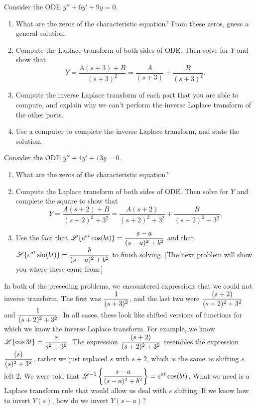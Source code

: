 \begin{problem}
 Consider the ODE $y''+6y'+9y=0$.  
\begin{enumerate}
 \item What are the zeros of the characteristic equation? From these zeros, guess a general solution.
 \item Compute the Laplace transform of both sides of ODE. Then solve for $Y$ and show that 
$$Y = \frac{A(s+3)+B}{(s+3)^2} =  \frac{A}{(s+3)}+\frac{B}{(s+3)^2}. $$
 \item Compute the inverse Laplace transform of each part that you are able to compute, and explain why we can't perform the inverse Laplace transform of the other parts. 
 \item Use a computer to complete the inverse Laplace transform, and state the solution.
\end{enumerate}
\end{problem}

\begin{problem}
 Consider the ODE $y''+4y'+13y=0$.  
\begin{enumerate}
 \item What are the zeros of the characteristic equation?
 \item Compute the Laplace transform of both sides of ODE. Then solve for $Y$ and complete the square to show that 
$$Y = \frac{A(s+2)+B}{(s+2)^2+3^2} = \frac{A(s+2)}{(s+2)^2+3^2} +  \frac{B}{(s+2)^2+3^2}. $$
 \item Use the fact that $\displaystyle \mathscr{L}\{e^{at}\cos(bt)\} = \frac{s-a}{(s-a)^2+b^2}$ and that $\displaystyle \mathscr{L}\{e^{at}\sin(bt)\} = \frac{b}{(s-a)^2+b^2}$ to finish solving. [The next problem will show you where these came from.] 
\end{enumerate}
\end{problem}

In both of the preceding problems, we encountered expressions that we could not inverse transform. The first was $\displaystyle\frac{1}{(s+3)^2}$, and the last two were $\displaystyle\frac{(s+2)}{(s+2)^2+3^2}$ and $\displaystyle\frac{1}{(s+2)^2+3^2}$. In all cases, these look like shifted versions of functions for which we know the inverse Laplace transform.  For example, we know $\displaystyle \mathscr{L}\{\cos 3t\} = \frac{s}{s^2+3^9}$.  The expression $\displaystyle\frac{(s+2)}{(s+2)^2+3^2}$ resembles the expression $\displaystyle\frac{(s)}{(s)^2+3^2}$, rather we just replaced $s$ with $s+2$, which is the same as shifting $s$ left 2. We were told that $\displaystyle \mathscr{L}^{-1}\left\{\frac{s-a}{(s-a)^2+b^2}\right\} = e^{at}\cos(bt)$. What we need is a Laplace transform rule that would allow us deal with $s$ shifting. If we know how to invert $Y(s)$, how do we invert $Y(s-a)$?


